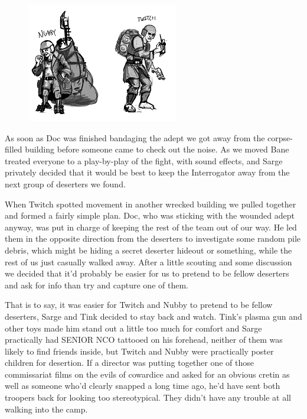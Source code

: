 \begin{figure}
	\begin{center}
		\includegraphics[width=\figwidth]{pics/9/18.png}
	\end{center}
\end{figure}
As soon as Doc was finished bandaging the adept we got away from the corpse-filled building before someone came to check out the noise. 
As we moved Bane treated everyone to a play-by-play of the fight, with sound effects, and Sarge privately decided that it would be best to keep the Interrogator away from the next group of deserters we found.

When Twitch spotted movement in another wrecked building we pulled together and formed a fairly simple plan. 
Doc, who was sticking with the wounded adept anyway, was put in charge of keeping the rest of the team out of our way. 
He led them in the opposite direction from the deserters to investigate some random pile debris, which might be hiding a secret deserter hideout or something, while the rest of us just casually walked away. 
After a little scouting and some discussion we decided that it'd probably be easier for us to pretend to be fellow deserters and ask for info than try and capture one of them.

That is to say, it was easier for Twitch and Nubby to pretend to be fellow deserters, Sarge and Tink decided to stay back and watch. 
Tink's plasma gun and other toys made him stand out a little too much for comfort and Sarge practically had SENIOR NCO tattooed on his forehead, neither of them was likely to find friends inside, but Twitch and Nubby were practically poster children for desertion. 
If a director was putting together one of those commissariat films on the evils of cowardice and asked for an obvious cretin as well as someone who'd clearly snapped a long time ago, he'd have sent both troopers back for looking too stereotypical. 
They didn't have any trouble at all walking into the camp.

